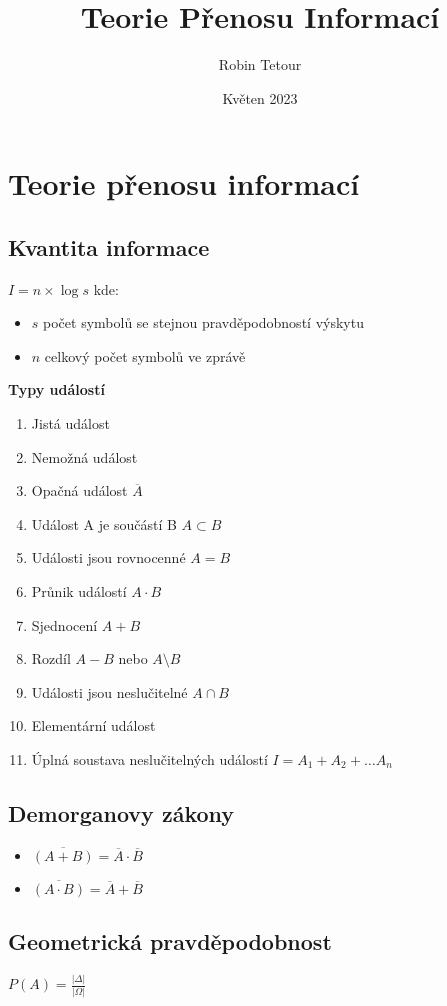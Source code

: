 \documentclass{article}
\title{Teorie Přenosu Informací}
\author{Robin Tetour}
\date{Květen 2023}
\begin{document}
\maketitle

\section{Teorie přenosu informací}
\subsection{Kvantita informace}
$I=n\times\log s$ kde:
\begin{itemize}
    \item $s$ počet symbolů se stejnou pravděpodobností výskytu
    \item $n$ celkový počet symbolů ve zprávě
\end{itemize}

\textbf{Typy událostí}
\begin{enumerate}
    \item Jistá událost
    \item Nemožná událost
    \item Opačná událost $\overline{A}$
    \item Událost A je součástí B $A\subset B$
    \item Události jsou rovnocenné $A=B$
    \item Průnik událostí $A\cdot B$
    \item Sjednocení $A+B$
    \item Rozdíl $A-B$ nebo $A\setminus B$
    \item Události jsou neslučitelné $A\cap B$
    \item Elementární událost
    \item Úplná soustava neslučitelných událostí $I=A_{1}+A_{2}+\ldots A_{n}$
\end{enumerate}

\subsection{Demorganovy zákony}
\begin{itemize}
    \item $\overline{\left(A+B\right)}=\overline{A}\cdot\overline{B}$
    \item $\overline{\left(A\cdot B\right)}=\overline{A}+\overline{B}$
\end{itemize}

\subsection{Geometrická pravděpodobnost}
$P\left(A\right)=\frac{\left|\Delta\right|}{\left|\Omega\right|}$
\end{document}
